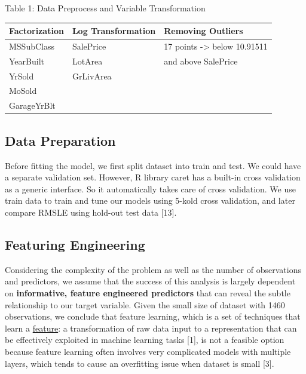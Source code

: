 \documentclass[a4paper]{article}
\begin{document}
\begin{flushleft}
Table 1: Data Preprocess and Variable Transformation

\vspace{2mm}
\begin{center}
\begin{tabular}{ | p{4.5cm} | p{4.5cm} | p{4.5cm} |}
  \hline			
  Factorization & Log Transformation & Removing Outliers\\
  \hline  
  MSSubClass & SalePrice & 17 points -> below 10.91511 \\
  YearBuilt & LotArea & and above SalePrice \\
  YrSold & GrLivArea & \\ 
  MoSold & & \\
  GarageYrBlt & & \\
  \hline  
\end{tabular}
\end{center}

\subsection{Data Preparation}
Before fitting the model, we first split dataset into train and test. We could have a separate validation set. However,  R library caret has a built-in cross validation as a generic interface. So it automatically takes care of cross validation. We use train data to train and tune our models using 5-kold cross validation, and later compare RMSLE using hold-out test data [13]. \newline

\subsection{Featuring Engineering}

Considering the complexity of the problem as well as the number of observations and predictors, we assume that the success of this analysis is largely dependent on \textbf{informative, feature engineered predictors} that can reveal the subtle relationship to our target variable. Given the small size of dataset with 1460 observations, we conclude that feature learning, which is a set of techniques that learn a \href{https://en.wikipedia.org/wiki/Feature_(machine_learning)}{feature}: a transformation of raw data input to a representation that can be effectively exploited in machine learning tasks [1], is not a feasible option because feature learning often involves very complicated models with multiple layers, which tends to cause an overfitting issue when dataset is small [3]. \newline


\end{flushleft}
\end{document}
